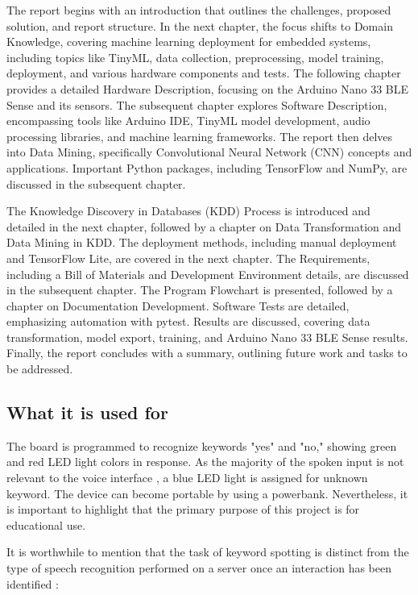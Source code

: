 The report begins with an introduction that outlines the challenges, proposed solution, and report structure. In the next chapter, the focus shifts to Domain Knowledge, covering machine learning deployment for embedded systems, including topics like TinyML, data collection, preprocessing, model training, deployment, and various hardware components and tests. The following chapter provides a detailed Hardware Description, focusing on the Arduino Nano 33 BLE Sense and its sensors. The subsequent chapter explores Software Description, encompassing tools like Arduino IDE, TinyML model development, audio processing libraries, and machine learning frameworks. The report then delves into Data Mining, specifically Convolutional Neural Network (CNN) concepts and applications. Important Python packages, including TensorFlow and NumPy, are discussed in the subsequent chapter. 

The Knowledge Discovery in Databases (KDD) Process is introduced and detailed in the next chapter, followed by a chapter on Data Transformation and Data Mining in KDD. The deployment methods, including manual deployment and TensorFlow Lite, are covered in the next chapter. The Requirements, including a Bill of Materials and Development Environment details, are discussed in the subsequent chapter. The Program Flowchart is presented, followed by a chapter on Documentation Development. Software Tests are detailed, emphasizing automation with pytest. Results are discussed, covering data transformation, model export, training, and Arduino Nano 33 BLE Sense results. Finally, the report concludes with a summary, outlining future work and tasks to be addressed.

\subsection{What it is used for}

The board is programmed to recognize keywords "yes" and "no," showing green and red LED light colors in response. As the majority of the spoken input is not relevant to the voice interface \cite{Warden:2018}, a blue LED light is assigned for unknown keyword. The device can become portable by using a powerbank. Nevertheless, it is important to highlight that the primary purpose of this project is for educational use.

It is worthwhile to mention that the task of keyword spotting is distinct from the type of speech recognition performed on a server once an interaction has been identified \cite{Warden:2018}:

